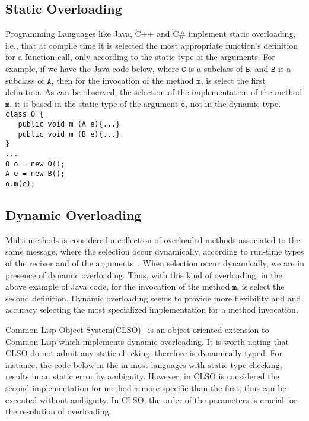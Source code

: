 \documentclass[hidelinks, twocolumn]{article}
\begin{document}
\subsection{Static Overloading}
Programming Languages like Java, C++ and C\# implement static overloading, i.e., that at compile time it is selected the most appropriate  function's definition for a function call, only according to the static type of the arguments. For example, if we have the Java code below, where $\texttt{C}$ is a subclass of $\texttt{B}$, and $\texttt{B}$ is a subclass of $\texttt{A}$, then for the invocation of the method $\texttt{m}$, is select the first definition. As can be observed, the selection of the implementation of the method $\texttt{m}$, it is based in the static type of the argument $\texttt{e}$, not in the dynamic type.                                   \\
\texttt{class O \{\\
\ \ \ public void m (A e)\{...\}\\
\ \ \ public void m (B e)\{...\}\\
\}\\
...\\
O o = new O();\\
A e = new B();\\
o.m(e);}        
\subsection{Dynamic Overloading}
Multi-methods is considered a collection of overloaded methods associated to the same message, where the selection occur dynamically, according to run-time types of the reciver and of the arguments~\cite{FJM}. When selection occur dynamically, we are in presence of dynamic overloading. Thus, with this kind of overloading, in the above example of Java code, for the invocation of the method $\texttt{m}$, is select the second definition. Dynamic overloading seems to provide more flexibility and and accuracy selecting the most specialized implementation for a method invocation.

Common Lisp Object System(CLSO)~\cite{Bobrow:1988:CLO:885631.885632} is an object-oriented extension to Common Lisp which implements dynamic overloading. It is worth noting that CLSO do not admit any static checking, therefore is dynamically typed. For instance, the code below in the in most languages with static type checking, results in an static error by ambiguity. However, in CLSO is considered the second implementation for  method $\texttt{m}$ more specific than the first, thus can be executed without ambiguity. In CLSO, the order of the parameters is crucial for the resolution of overloading.\\
\end{document}
